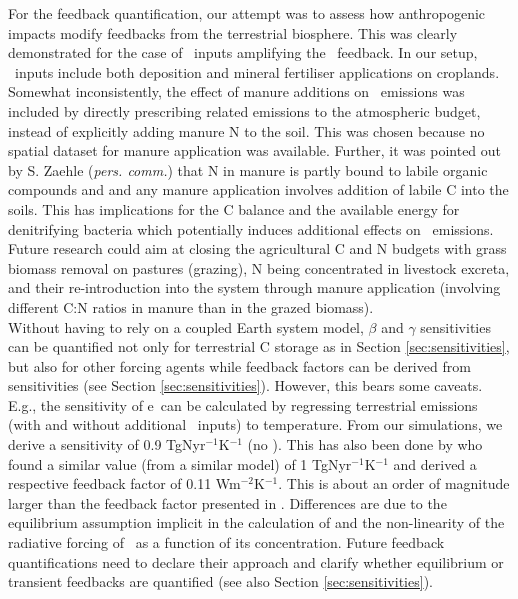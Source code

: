For the feedback quantification, our attempt was to assess how anthropogenic impacts modify feedbacks from the terrestrial biosphere. This was clearly demonstrated for the case of \nr\ inputs amplifying the \nno\ feedback. In our setup, \nr\ inputs include both deposition and mineral fertiliser applications on croplands. Somewhat inconsistently, the effect of manure additions on \nno\ emissions was included by directly prescribing related emissions to the atmospheric budget, instead of explicitly adding manure N to the soil. This was chosen because no spatial dataset for manure application was available. Further, it was pointed out by S. Zaehle ({\it pers. comm.}) that N in manure is partly bound to labile organic compounds and and any manure application involves addition of labile C into the soils. This has implications for the C balance and the available energy for denitrifying bacteria which potentially induces additional effects on \nno\ emissions. Future research could aim at closing the agricultural C and N budgets with grass biomass removal on pastures (grazing), N being concentrated in livestock excreta, and their re-introduction into the system through manure application (involving different C:N ratios in manure than in the grazed biomass).\\

Without having to rely on a coupled Earth system model, $\beta$ and $\gamma$ sensitivities can be quantified not only for terrestrial C storage as in Section \ref{sec:sensitivities}, but also for other forcing agents while feedback factors can be derived from sensitivities (see Section \ref{sec:sensitivities}). However, this bears some caveats. E.g., the sensitivity of e\nno\ can be calculated by regressing terrestrial emissions (with and without additional \nr\ inputs) to temperature. From our simulations, we derive a sensitivity of 0.9 TgNyr$^{-1}$K$^{-1}$ (no \nr ). This has also been done by \citet{xuri12nphyt} who found a similar value (from a similar model) of 1 TgNyr$^{-1}$K$^{-1}$ and derived a respective feedback factor of 0.11 Wm$^{-2}$K$^{-1}$. This is about an order of magnitude larger than the feedback factor presented in \citet{stocker13natcc}. Differences are due to the equilibrium assumption implicit in the calculation of \citet{xuri12nphyt} and the non-linearity of the radiative forcing of \nno\ as a function of its concentration. Future feedback quantifications need to declare their approach and clarify whether equilibrium or transient feedbacks are quantified (see also Section \ref{sec:sensitivities}).  




